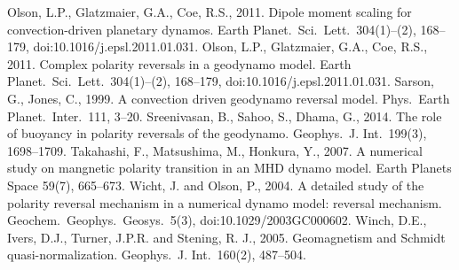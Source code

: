 \begin{thebibliography}{}
%
Olson, L.P., Glatzmaier, G.A., Coe, R.S., 2011. Dipole moment scaling for convection-driven planetary dynamos. Earth Planet.\ Sci.\ Lett.\ 304(1)--(2), 168--179, doi:10.1016/j.epsl.2011.01.031.
%
Olson, L.P., Glatzmaier, G.A., Coe, R.S., 2011. Complex polarity reversals in a geodynamo model. Earth Planet.\ Sci.\ Lett.\ 304(1)--(2), 168--179, doi:10.1016/j.epsl.2011.01.031.
%
Sarson, G., Jones, C., 1999. A convection driven geodynamo reversal model. Phys.\ Earth Planet.\ Inter.\ 111, 3--20.
%
Sreenivasan, B., Sahoo, S., Dhama, G., 2014. The role of buoyancy in polarity reversals of the geodynamo. Geophys.\ J. Int.\ 199(3), 1698--1709.
%
Takahashi, F., Matsushima, M., Honkura, Y., 2007. A numerical study on mangnetic polarity transition in an MHD dynamo model. Earth Planets Space 59(7), 665--673.
%
%
Wicht, J. and Olson, P., 2004. A detailed study of the polarity reversal mechanism in a numerical dynamo model: reversal mechanism. Geochem.\ Geophys.\ Geosys.\ 5(3), doi:10.1029/2003GC000602.
%
Winch, D.E., Ivers, D.J., Turner, J.P.R. and Stening, R. J., 2005. Geomagnetism and Schmidt quasi-normalization. Geophys.\ J. Int.\ 160(2), 487--504.

\end{thebibliography}